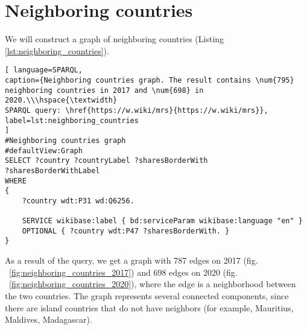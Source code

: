 \section{Neighboring countries}

We will construct a graph of neighboring countries (Listing \ref{lst:neighboring_countries}).

\begin{lstlisting}[ language=SPARQL, 
caption={Neighboring countries graph. The result contains \num{795} neighboring countries in 2017 and \num{698} in 2020.\\\hspace{\textwidth}
SPARQL query: \href{https://w.wiki/mrs}{https://w.wiki/mrs}},
label=lst:neighboring_countries
]
#Neighboring countries graph
#defaultView:Graph
SELECT ?country ?countryLabel ?sharesBorderWith 
?sharesBorderWithLabel
WHERE
{
	?country wdt:P31 wd:Q6256.
	
	SERVICE wikibase:label { bd:serviceParam wikibase:language "en" }
	OPTIONAL { ?country wdt:P47 ?sharesBorderWith. }
}
\end{lstlisting}


\begin{figure*}
	{
		\setlength{\fboxsep}{0pt}%
		\setlength{\fboxrule}{1pt}%
	}
	\caption{Neighboring countries graph, 2017.
	}%
	\label{fig:neighboring_countries_2017}%
\end{figure*}

\begin{figure*}
	{
		\setlength{\fboxsep}{0pt}%
		\setlength{\fboxrule}{1pt}%
	}
	\caption{Neighboring countries graph, 2020.
	}%
	\label{fig:neighboring_countries_2020}%
\end{figure*}

As a result of the query, we get a graph with 787 edges on 2017 (fig. ~\ref{fig:neighboring_countries_2017}) and 698 edges on 2020 (fig. ~\ref{fig:neighboring_countries_2020}), where the edge is a neighborhood between the two countries. The graph represents several connected components, since there are island countries that do not have neighbors (for example, Mauritius, Maldives, Madagascar).

